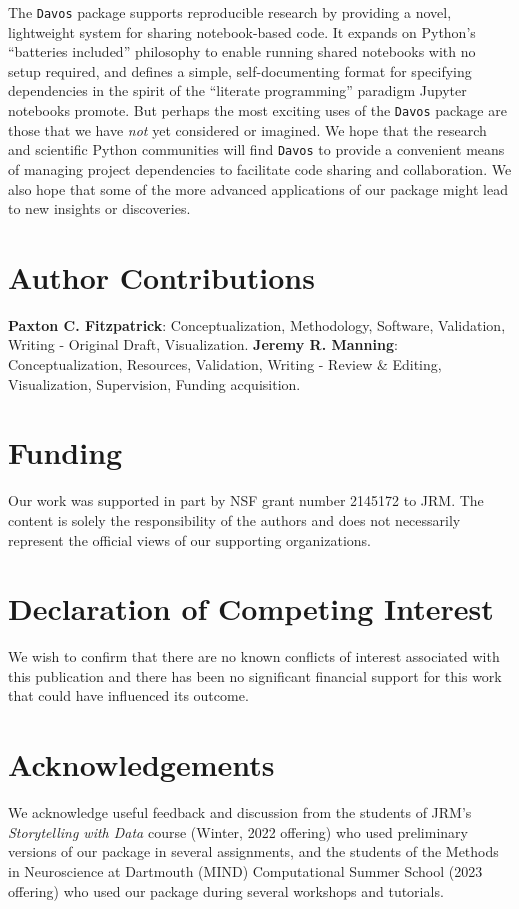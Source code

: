 \documentclass[preprint,12pt,a4paper]{elsarticle}
\begin{document}
The \texttt{Davos} package supports reproducible research by providing
a novel, lightweight system for sharing notebook-based code. It
expands on Python's ``batteries included'' philosophy to enable running shared
notebooks with no setup required, and defines a simple, self-documenting format for
specifying dependencies in the spirit of the ``literate programming'' paradigm Jupyter notebooks promote.
But perhaps the most exciting uses of the \texttt{Davos} package are those
that we have \textit{not} yet considered or imagined. We hope that the
research and scientific Python communities will find \texttt{Davos} to provide a convenient
means of managing project dependencies to facilitate code sharing and collaboration. We
also hope that some of the more advanced applications of our package
might lead to new insights or discoveries.


\section*{Author Contributions}

\textbf{Paxton C. Fitzpatrick}: Conceptualization, Methodology,
Software, Validation, Writing - Original Draft,
Visualization. \textbf{Jeremy R. Manning}: Conceptualization,
Resources, Validation, Writing - Review \& Editing, Visualization, Supervision,
Funding acquisition.

\section*{Funding}

Our work was supported in part by NSF grant number 2145172 to JRM.
The content is solely the responsibility of the authors and does not
necessarily represent the official views of our supporting
organizations.


\section*{Declaration of Competing Interest}

We wish to confirm that there are no known conflicts of interest
associated with this publication and there has been no significant
financial support for this work that could have influenced its
outcome.


\section*{Acknowledgements}

We acknowledge useful feedback and discussion from the students of
JRM's \textit{Storytelling with Data} course (Winter, 2022 offering)
who used preliminary versions of our package in several assignments,
and the students of the Methods in Neuroscience at Dartmouth (MIND)
Computational Summer School (2023 offering) who used our package
during several workshops and tutorials.




\end{document}
